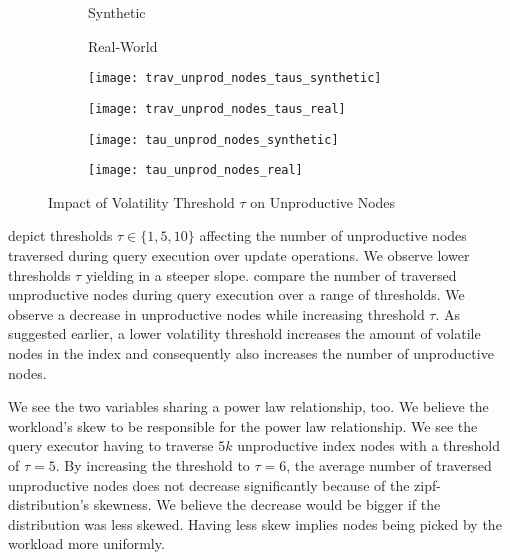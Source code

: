 \documentclass[abstracton,12pt]{scrartcl}
\theoremstyle{definition}
\begin{document}
\begin{figure}[h]
  \centering
  \begin{subfigure}{0.49\linewidth}
    \centering
    Synthetic
  \end{subfigure}
  \begin{subfigure}{0.49\linewidth}
    \centering
    Real-World
  \end{subfigure}
  \begin{subfigure}{0.49\linewidth}
    \centering
    \texttt{[image: trav\_unprod\_nodes\_taus\_synthetic]}
    \caption{}
    \label{fig:trav_unprod_nodes_taus_synthetic}
  \end{subfigure}
  \begin{subfigure}{0.49\linewidth}
    \centering
    \texttt{[image: trav\_unprod\_nodes\_taus\_real]}
    \caption{}
    \label{fig:trav_unprod_nodes_taus_real}
  \end{subfigure}
  \begin{subfigure}{0.49\linewidth}
    \centering
    \texttt{[image: tau\_unprod\_nodes\_synthetic]}
    \caption{}
    \label{fig:tau_trav_unprod_nodes_synthetic}
  \end{subfigure}
  \begin{subfigure}{0.49\linewidth}
    \centering
    \texttt{[image: tau\_unprod\_nodes\_real]}
    \caption{}
    \label{fig:tau_trav_unprod_nodes_real}
  \end{subfigure}
  \caption{Impact of Volatility Threshold $\tau$ on Unproductive Nodes}
\end{figure}


depict thresholds $\tau \in \{1,5,10\}$ affecting the number of unproductive
nodes traversed during query execution over update operations. We observe lower
thresholds $\tau$ yielding in a steeper slope.
 compare the
number of traversed unproductive nodes during query execution over a range of
thresholds. We observe a decrease in unproductive nodes while increasing
threshold $\tau$. As suggested earlier, a lower volatility threshold
increases the amount of volatile nodes in the index and consequently also
increases the number of unproductive nodes. 

We see the two variables sharing a power law relationship, too. We believe the
workload's skew to be responsible for the power law relationship. We see
the query executor having to traverse $5k$ unproductive index nodes with a
threshold of $\tau = 5$. By increasing the threshold to $\tau = 6$, the average
number of traversed unproductive nodes does not decrease significantly because
of the zipf-distribution's skewness. We believe the decrease would be bigger if the
distribution was less skewed. Having less skew implies nodes being picked
by the workload more uniformly.
\end{document}
